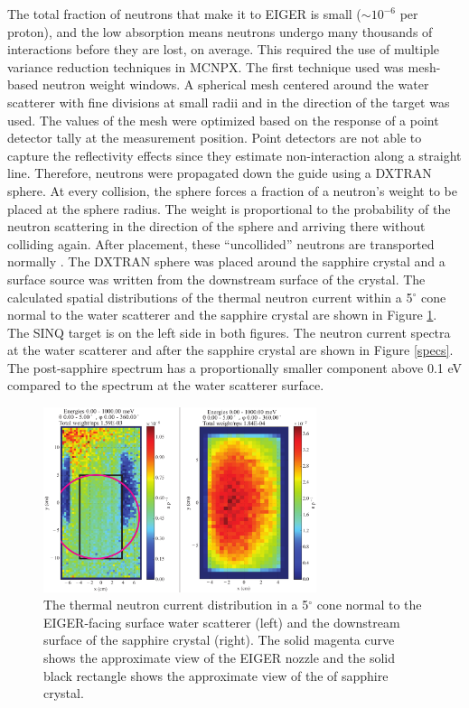 \documentclass[a4paper,
              ]{jacow}
\begin{document}
The total fraction of neutrons that make it to EIGER is small ($\sim 10^{-6}$ per proton), and the low absorption means neutrons undergo many thousands of interactions before they are lost, on average.  This required the use of multiple variance reduction techniques in MCNPX.  The first technique used was mesh-based neutron weight windows.  A spherical mesh centered around the water scatterer with fine divisions at small radii and in the direction of the target was used.  The values of the mesh were optimized based on the response of a point detector tally at the measurement position.  Point detectors are not able to capture the reflectivity effects since they estimate non-interaction along a straight line.  Therefore, neutrons were propagated down the guide using a DXTRAN sphere.  At every collision, the sphere forces a fraction of a neutron's weight to be placed at the sphere radius.  The weight is proportional to the probability of the neutron scattering in the direction of the sphere and arriving there without colliding again.  After placement, these ``uncollided'' neutrons are transported normally \cite{mcnpx270}.  The DXTRAN sphere was placed around the sapphire crystal and a surface source was written from the downstream surface of the crystal.  The calculated spatial distributions of the thermal neutron current within a 5$^\circ$ cone normal to the water scatterer and the sapphire crystal are shown in Figure \ref{dists}.  The SINQ target is on the left side in both figures.  The neutron current spectra at the water scatterer and after the sapphire crystal are shown in Figure \ref{specs}.  The post-sapphire spectrum has a proportionally smaller component above 0.1 eV compared to the spectrum at the water scatterer surface.


\begin{figure}[!htb]
   \centering
   \includegraphics*[trim = 0mm 0mm 0mm 0mm, width=80mm]{graphics/dists.pdf}
   \caption{The thermal neutron current distribution in a 5$^\circ$ cone normal to the EIGER-facing surface water scatterer (left) and the downstream surface of the sapphire crystal (right).  The solid magenta curve shows the approximate view of the EIGER nozzle and the solid black rectangle shows the approximate view of the of sapphire crystal.}
   \label{dists}
\end{figure}
\end{document}

